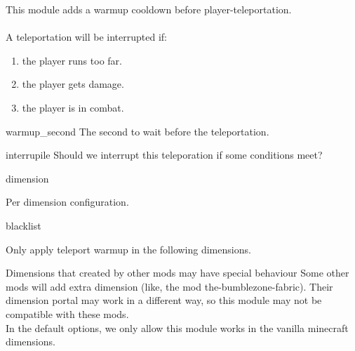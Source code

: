 \label{ch:teleport_warmup}

This module adds a warmup cooldown before player-teleportation.\\
\\
A teleportation will be interrupted if:
\begin{enumerate}
    \item the player runs too far.
    \item the player gets damage.
    \item the player is in combat.
\end{enumerate}

\begin{Configuration}
    \item[warmup\_second]{
        The second to wait before the teleportation.
    }

    \item[interrupile]{
        Should we interrupt this teleporation if some conditions meet?
    }

    \item[dimension]{
        Per dimension configuration.

        \begin{NestedList}
            \item[blacklist] {
                Only apply teleport warmup in the following dimensions.

                \begin{warn}{Dimensions that created by other mods may have special behaviour}
                    Some other mods will add extra dimension (like, the mod the-bumblezone-fabric).
                    Their dimension portal may work in a different way, so this module may not be compatible with these mods.\\
                    In the default options, we only allow this module works in the vanilla minecraft dimensions.
                \end{warn}
            }
        \end{NestedList}
    }
\end{Configuration}

